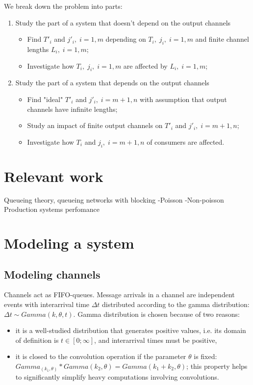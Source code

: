 
We break down the problem into parts:
  \begin{enumerate}
  \item Study the part of a system that doesn't depend on the output channels
    \begin{itemize}
    \item Find $T'_{i}$ and $j'_{i}, \; i=1,m$ depending on $T_{i}, \; j_{i}, \; i=1,m$ and finite channel lengths $L_{i}, \; i=1,m$;
    \item Investigate how $T_{i}, \; j_{i}, \; i=1,m$ are affected by $L_{i}, \; i=1,m$;
  \end{itemize}

  \item Study the part of a system that depends on the output channels
    \begin{itemize}
    \item Find "ideal" $T'_{i}$ and $j'_{i}, \; i=m+1,n$ with assumption that output channels have infinite lengths;
    \item Study an impact of finite output channels on $T'_{i}$ and $j'_{i}, \; i=m+1,n$;
    \item Investigate how $T_{i}$ and $j_{i}, \; i=m+1,n$ of consumers are affected.
    \end{itemize}
  \end{enumerate}


\section{Relevant work}
Queueing theory, queueing networks with blocking
-Poisson
-Non-poisson
Production systems perfomance


\section{Modeling a system}

  \subsection{Modeling channels}
Channels act as FIFO-queues. Message arrivals in a channel are independent events with interarrival time $\Delta t$ distributed according to the gamma distribution: $\Delta t \sim Gamma (k, \theta, t)$. Gamma distribution is chosen because of two reasons:
    \begin{itemize}
    \item it is a well-studied distribution that generates positive values, i.e. its domain of definition is $t \in [0;\infty]$, and interarrival times must be positive,
    \item it is closed to the convolution operation if the parameter $\theta$ is fixed: $Gamma_(k_{1}, \theta) * Gamma (k_{2}, \theta) = Gamma (k_{1} + k_{2}, \theta)$; this property helps to significantly simplify heavy computations involving convolutions.
    \end{itemize}

